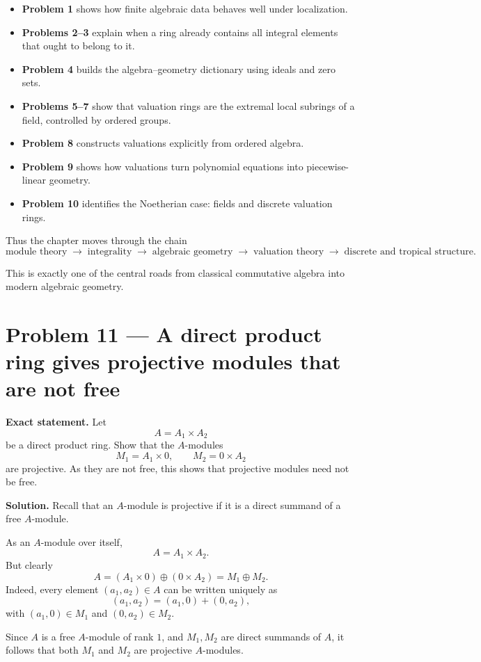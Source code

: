 \documentclass[12pt,a4paper]{article}
\theoremstyle{plain}
\theoremstyle{definition}      %
\begin{document}
\begin{itemize}
	\item \textbf{Problem 1} shows how finite algebraic data behaves well under localization.
	\item \textbf{Problems 2--3} explain when a ring already contains all integral elements that ought to belong to it.
	\item \textbf{Problem 4} builds the algebra--geometry dictionary using ideals and zero sets.
	\item \textbf{Problems 5--7} show that valuation rings are the extremal local subrings of a field, controlled by ordered groups.
	\item \textbf{Problem 8} constructs valuations explicitly from ordered algebra.
	\item \textbf{Problem 9} shows how valuations turn polynomial equations into piecewise-linear geometry.
	\item \textbf{Problem 10} identifies the Noetherian case: fields and discrete valuation rings.
\end{itemize}

Thus the chapter moves through the chain
\[
\text{module theory}
\;\to\;
\text{integrality}
\;\to\;
\text{algebraic geometry}
\;\to\;
\text{valuation theory}
\;\to\;
\text{discrete and tropical structure}.
\]

This is exactly one of the central roads from classical commutative algebra into modern algebraic geometry.	
	
	
\section*{Problem 11 --- A direct product ring gives projective modules that are not free}

\textbf{Exact statement.}
Let
\[
A=A_1\times A_2
\]
be a direct product ring. Show that the \(A\)-modules
\[
M_1=A_1\times 0,\qquad M_2=0\times A_2
\]
are projective. As they are not free, this shows that projective modules need not be free.

\textbf{Solution.}
Recall that an \(A\)-module is projective if it is a direct summand of a free \(A\)-module.

As an \(A\)-module over itself,
\[
A=A_1\times A_2.
\]
But clearly
\[
A=(A_1\times 0)\oplus (0\times A_2)=M_1\oplus M_2.
\]
Indeed, every element \((a_1,a_2)\in A\) can be written uniquely as
\[
(a_1,a_2)=(a_1,0)+(0,a_2),
\]
with \((a_1,0)\in M_1\) and \((0,a_2)\in M_2\).

Since \(A\) is a free \(A\)-module of rank \(1\), and \(M_1,M_2\) are direct summands of \(A\), it follows that both \(M_1\) and \(M_2\) are projective \(A\)-modules.
\end{document}
